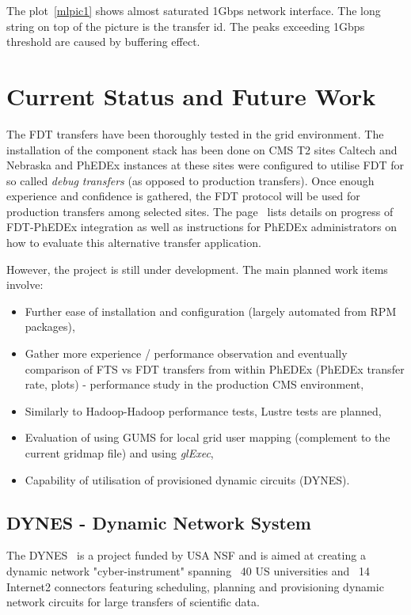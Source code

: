 \documentclass[a4paper]{jpconf}
\begin{document}
The plot~\ref{mlpic1} shows almost saturated 1Gbps network
interface. The long
string on top of the picture is the transfer id. The peaks exceeding 1Gbps
threshold are caused by buffering effect.


\section{Current Status and Future Work} %
The FDT transfers have been thoroughly tested in the grid environment. The
installation of the component stack has been done on CMS T2 sites Caltech and
Nebraska and PhEDEx instances at these sites were configured to utilise FDT
for so
called \emph{debug transfers} (as opposed to production transfers).
Once enough experience and
confidence is gathered, the FDT protocol will be used for production
transfers among selected sites. The
page~\cite{phedexfdt} lists details on progress of FDT-PhEDEx integration as
well as instructions for PhEDEx administrators on how to evaluate this
alternative transfer application.

However, the project is still under development. The main planned work
items involve:
\begin{itemize}
\item Further ease of installation and configuration (largely
automated from RPM packages),
\item Gather more experience / performance observation and eventually
comparison of FTS vs FDT transfers from within PhEDEx (PhEDEx transfer rate,
plots) - performance study in the production CMS environment,
\item Similarly to Hadoop-Hadoop performance tests, Lustre tests are planned,
\item Evaluation of using GUMS for local grid user mapping (complement to the
current gridmap file) and using \emph{glExec},
\item Capability of utilisation of provisioned dynamic circuits
(DYNES).
\end{itemize}

\subsection{DYNES - Dynamic Network System}
\label{dynes}
The DYNES~\cite{dynesref} is a project funded by USA NSF and is aimed at
creating a dynamic network "cyber-instrument" spanning ~40 US universities
and ~14 Internet2 connectors featuring scheduling, planning and provisioning
dynamic network circuits for large transfers of scientific data.
\end{document}
